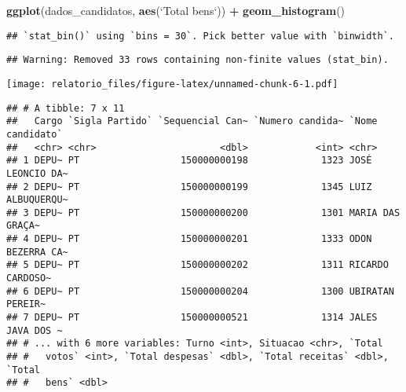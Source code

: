 \documentclass[]{article}
\newenvironment{Shaded}{\begin{snugshade}}{\end{snugshade}}
\newcommand{\KeywordTok}[1]{\textcolor[rgb]{0.13,0.29,0.53}{\textbf{#1}}}
\newcommand{\DataTypeTok}[1]{\textcolor[rgb]{0.13,0.29,0.53}{#1}}
\newcommand{\StringTok}[1]{\textcolor[rgb]{0.31,0.60,0.02}{#1}}
\newcommand{\OperatorTok}[1]{\textcolor[rgb]{0.81,0.36,0.00}{\textbf{#1}}}
\newcommand{\NormalTok}[1]{#1}
\begin{document}
\begin{Shaded}
\begin{Highlighting}[]
\KeywordTok{ggplot}\NormalTok{(dados_candidatos, }\KeywordTok{aes}\NormalTok{(}\StringTok{`}\DataTypeTok{Total bens}\StringTok{`}\NormalTok{)) }\OperatorTok{+}
\KeywordTok{geom_histogram}\NormalTok{()}
\end{Highlighting}
\end{Shaded}

\begin{verbatim}
## `stat_bin()` using `bins = 30`. Pick better value with `binwidth`.
\end{verbatim}

\begin{verbatim}
## Warning: Removed 33 rows containing non-finite values (stat_bin).
\end{verbatim}

\texttt{[image: relatorio\_files/figure-latex/unnamed-chunk-6-1.pdf]}

\begin{Shaded}
\end{Shaded}

\begin{verbatim}
## # A tibble: 7 x 11
##   Cargo `Sigla Partido` `Sequencial Can~ `Numero candida~ `Nome candidato`
##   <chr> <chr>                      <dbl>            <int> <chr>           
## 1 DEPU~ PT                  150000000198             1323 JOSÉ LEONCIO DA~
## 2 DEPU~ PT                  150000000199             1345 LUIZ ALBUQUERQU~
## 3 DEPU~ PT                  150000000200             1301 MARIA DAS GRAÇA~
## 4 DEPU~ PT                  150000000201             1333 ODON BEZERRA CA~
## 5 DEPU~ PT                  150000000202             1311 RICARDO CARDOSO~
## 6 DEPU~ PT                  150000000204             1300 UBIRATAN PEREIR~
## 7 DEPU~ PT                  150000000521             1314 JALES JAVA DOS ~
## # ... with 6 more variables: Turno <int>, Situacao <chr>, `Total
## #   votos` <int>, `Total despesas` <dbl>, `Total receitas` <dbl>, `Total
## #   bens` <dbl>
\end{verbatim}

\begin{Shaded}
\end{Shaded}
\end{document}
